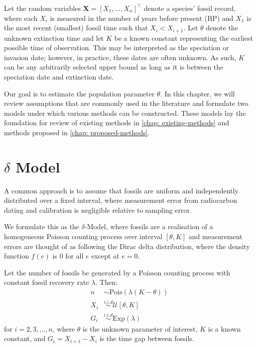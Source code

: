 
Let the random variables $\bm{X} = [X_1, \dots, X_n]^\top$ denote a species' fossil record, where each $X_i$ is measured in the number of years before present (BP) and $X_1$ is the most recent (smallest) fossil time such that $X_i < X_{i+1}$. Let $\theta$ denote the unknown extinction time and let $K$ be a known constant representing the earliest possible time of observation. This may be interpreted as the speciation or invasion date; however, in practice, these dates are often unknown. As such, $K$ can be any arbitrarily selected upper bound as long as it is between the speciation date and extinction date.

Our goal is to estimate the population parameter $\theta$. In this chapter, we will review assumptions that are commonly used in the literature and formulate two models under which various methods can be constructed. These models lay the foundation for review of existing methods in \autoref{chap: existing-methods} and methods proposed in \autoref{chap: proposed-methods}.

\section{$\delta$ Model}\label{section: delta-model}

A common approach is to assume that fossils are uniform and independently distributed over a fixed interval, where measurement error from radiocarbon dating and calibration is negligible relative to sampling error.

We formulate this as the $\delta$-Model, where fossils are a realisation of a homogeneous Poisson counting process over interval $[\theta, K]$ and measurement errors are thought of as following the Dirac delta distribution, where the density function $f(e)$ is 0 for all $e$ except at $e=0$.
\begin{model}\label{model: no-measurement-error}
    Let the number of fossils be generated by a Poisson counting process with constant fossil recovery rate $\lambda$. Then:
    \begin{align*}
        n   &\sim \textrm{Pois}(\lambda(K-\theta)) \\
        X_i &\overset{i.i.d}{\sim} \mathcal{U}[\theta, K] \\
        G_i &\overset{i.i.d}{\sim} \textrm{Exp}(\lambda)
    \end{align*}
    for $i = 2, 3, \dots, n$, where $\theta$ is the unknown parameter of interest, $K$ is a known constant, and $G_i = X_{i+1} - X_i$ is the time gap between fossils.
\end{model}

